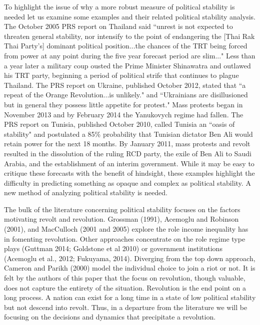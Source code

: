 \documentclass[12pt]{article}
\begin{document}
\begin{spacing}{1.5}
To highlight the issue of why a more robust measure of political stability is needed let us examine some examples and their related political stability analysis. The October 2005 PRS report on Thailand said ``unrest is not expected to threaten general stability, nor intensify to the point of endangering the [Thai Rak Thai Party's] dominant political position...the chances of the TRT being forced from power at any point during the five year forecast period are slim..." Less than a year later a military coup ousted the Prime Minister Shinawatra and outlawed his TRT party, beginning a period of political strife that continues to plague Thailand. The PRS report on Ukraine, published October 2012, stated that ``a repeat of the Orange Revolution...is unlikely." and ``Ukrainians are disillusioned but in general they possess little appetite for protest." Mass protests began in November 2013 and by February 2014 the Yanukovych regime had fallen. The PRS report on Tunisia, published October 2010, called Tunisia an ``oasis of stability" and postulated a 85\% probability that Tunisian dictator Ben Ali would retain power for the next 18 months. By January 2011, mass protests and revolt resulted in the dissolution of the ruling RCD party, the exile of Ben Ali to Saudi Arabia, and the establishment of an interim government. While it may be easy to critique these forecasts with the benefit of hindsight, these examples highlight the difficulty in predicting something as opaque and complex as political stability. A new method of analyzing political stability is needed. 

The bulk of the literature concerning political stability focuses on the factors motivating revolt and revolution. Grossman (1991), Acemoglu and Robinson (2001), and MacCulloch (2001 and 2005) explore the role income inequality has in fomenting revolution. Other approaches concentrate on the role regime type plays (Guttman 2014; Goldstone et al 2010) or government institutions (Acemoglu et al., 2012; Fukuyama, 2014). Diverging from the top down approach, Cameron and Parikh (2000) model the individual choice to join a riot or not. It is felt by the authors of this paper that the focus on revolution, though valuable, does not capture the entirety of the situation. Revolution is the end point on a long process. A nation can exist for a long time in a state of low political stability but not descend into revolt. Thus, in a departure from the literature we will be focusing on the decisions and dynamics that precipitate a revolution. 


\end{spacing}
\end{document}

